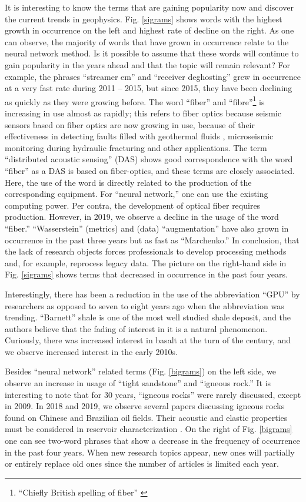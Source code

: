 \documentclass[geosciences,article,submit,moreauthors,pdftex]{Definitions/mdpi}
\begin{document}
It is interesting to know the terms that are gaining popularity now and discover the current trends in geophysics. Fig. \ref{sigrams} shows words with the highest growth in occurrence on the left and highest rate of decline on the right. As one can observe, the majority of words that have grown in occurrence relate to the neural network method. Is it possible to assume that these words will continue to gain popularity in the years ahead and that the topic will remain relevant? For example, the phrases ``streamer em'' and ``receiver deghosting'' grew in occurrence at a very fast rate during 2011 – 2015, but since 2015, they have been declining as quickly as they were growing before. The word ``fiber'' and ``fibre''\footnote{``Chiefly British spelling of fiber'' \citep{MW2020}} is increasing in use almost as rapidly; this refers to fiber optics because seismic sensors based on fiber optics are now growing in use, because of their effectiveness in detecting faults filled with geothermal fluids \citep{Trainor-Guitton2018}, microseismic monitoring during hydraulic fracturing \citep{Binder2019} and other applications. The term “distributed acoustic sensing” (DAS) shows good correspondence with the word “fiber” as a DAS is based on fiber-optics, and these terms are closely associated. Here, the use of the word is directly related to the production of the corresponding equipment. For ``neural network,'' one can use the existing computing power. Per contra, the development of optical fiber requires production. However, in 2019, we observe a decline in the usage of the word ``fiber.'' ``Wasserstein'' (metrics) and (data) ``augmentation'' have also grown in occurrence in the past three years but as fast as ``Marchenko.'' In conclusion, that the lack of research objects forces professionals to develop processing methods and, for example, reprocess legacy data. The picture on the right-hand side in Fig. \ref{sigrams} shows terms that decreased in occurrence in the past four years.

Interestingly, there has been a reduction in the use of the abbreviation ``GPU'' by researchers as opposed to seven to eight years ago when the abbreviation was trending. ``Barnett'' shale is one of the most well studied shale deposit, and the authors believe that the fading of interest in it is a natural phenomenon. Curiously, there was increased interest in basalt at the turn of the century, and we observe increased interest in the early 2010s.


Besides ``neural network'' related terms (Fig. \ref{bigrams}) on the left side, we observe an increase in usage of ``tight sandstone'' and ``igneous rock.'' It is interesting to note that for 30 years, ``igneous rocks'' were rarely discussed, except in 2009. In 2018 and 2019, we observe several papers discussing igneous rocks found on Chinese and Brazilian oil fields. Their acoustic and elastic properties must be considered in reservoir characterization \citep{Penna2019}. On the right of Fig. \ref{bigrams} one can see two-word phrases that show a decrease in the frequency of occurrence in the past four years. When new research topics appear, new ones will partially or entirely replace old ones since the number of articles is limited each year. 
\end{document}
